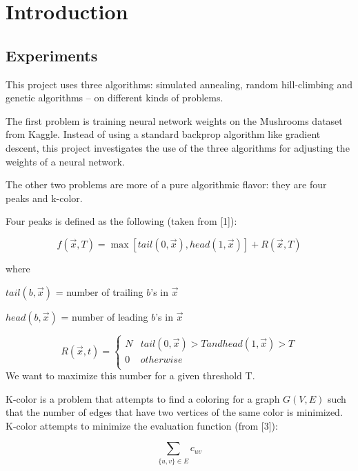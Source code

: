 \documentclass[11pt]{article}
\begin{document}
        \section{Introduction}
            \subsection{Experiments}
            This project uses three algorithms: simulated annealing, random hill-climbing and genetic algorithms -- on different
            kinds of problems.

            The first problem is training neural network weights on the Mushrooms dataset from Kaggle. Instead of using a standard
            backprop algorithm like gradient descent, this project investigates the use of the three algorithms for adjusting
            the weights of a neural network.

            The other two problems are more of a pure algorithmic flavor: they are four peaks and k-color.

            Four peaks is defined as the following (taken from [1]):

            \[
                f(\vec{x}, T) = \max \left[ tail(0, \vec{x}), head(1, \vec{x})\right] + R(\vec{x}, T)
            \]    

            where

            $tail(b, \vec{x})$ = number of trailing $b$'s in $\vec{x}$

            $head(b, \vec{x})$ = number of leading $b$'s in $\vec{x}$
                
            \[
                R(\vec{x}, t) = 
                \begin{cases} 
                        N & tail(0, \vec{x}) > T and head(1, \vec{x}) > T \\
                        0 & otherwise \\
                     \end{cases}  
            \]
            We want to maximize this number for a given threshold T.

            K-color is a problem that attempts to find a coloring for
            a graph $G(V, E)$ such that the number of edges that have
            two vertices of the same color is minimized. K-color
            attempts to minimize the evaluation function (from [3]):

            \[
                 \sum_{\{u, v\} \in E} c_{uv}
            \]
\end{document}
